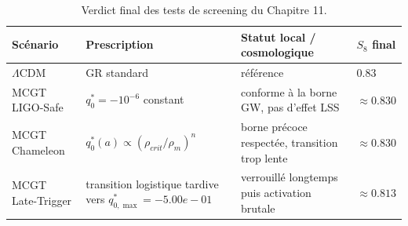 \begin{table}[htbp]
\centering
\caption{Verdict final des tests de screening du Chapitre 11.}
\label{tab:ch11_final_verdict}
\begin{tabular}{llll}
\toprule
Scénario & Prescription & Statut local / cosmologique & $S_8$ final \\
\midrule
$\Lambda$CDM & GR standard & référence & $0.83$ \\
MCGT LIGO-Safe & $q_0^*=-10^{-6}$ constant & conforme à la borne GW, pas d'effet LSS & $\approx 0.830$ \\
MCGT Chameleon & $q_0^*(a) \propto (\rho_{crit}/\rho_m)^n$ & borne précoce respectée, transition trop lente & $\approx 0.830$ \\
MCGT Late-Trigger & transition logistique tardive vers $q_{0,\max}^*=-5.00e-01$ & verrouillé longtemps puis activation brutale & $\approx 0.813$ \\
\bottomrule
\end{tabular}
\end{table}
